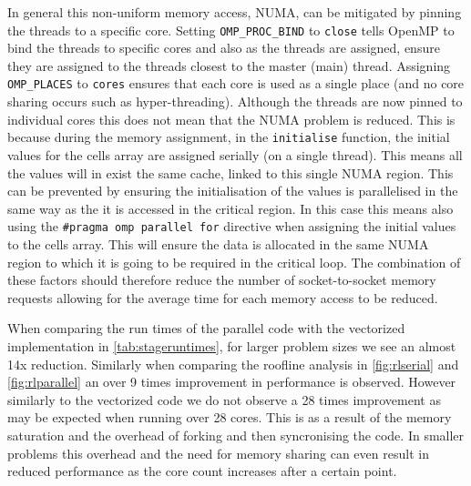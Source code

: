 \documentclass{article}
\begin{document}
\begin{multicols}{2}
In general this non-uniform memory access, NUMA, can be mitigated by pinning 
the threads to a specific core. Setting \verb|OMP_PROC_BIND| to \verb|close|
tells OpenMP to bind the threads to specific cores and also as the threads are
assigned, ensure they are assigned to the threads closest to the master (main)
thread. Assigning \verb|OMP_PLACES| to \verb|cores| ensures that each
core is used as a single place (and no core sharing occurs such as
hyper-threading). Although the threads are now pinned to individual cores this
does not mean that the NUMA problem is reduced. This is because during the
memory assignment, in the \verb|initialise| function, the initial values for the
cells array are assigned serially (on a single thread). This means all the
values will in exist the same cache, linked to this single NUMA region. This
can be prevented by ensuring the initialisation of the values is parallelised
in the same way as the it is accessed in the critical region. In this case this
means also using the \verb|#pragma omp parallel for| directive when assigning the initial
values to the cells array. This will ensure the data is allocated in the same
NUMA region to which it is going to be required in the critical loop. The
combination of these factors should therefore reduce the number of
socket-to-socket memory requests allowing for the average time for each memory
access to be reduced.  

When comparing the run times of the parallel code with the vectorized
implementation in \autoref{tab:stageruntimes}, for larger problem sizes we see
an almost 14x reduction. Similarly when comparing the roofline analysis in
\autoref{fig:rlserial} and \autoref{fig:rlparallel} an over 9 times improvement
in performance is observed. However similarly to the vectorized code we do not
observe a 28 times improvement as may be expected when running over 28 cores.
This is as a result of the memory saturation and the overhead of forking and
then syncronising the code. In smaller problems this overhead and the need for
memory sharing can even result in reduced performance as the core count increases
after a certain point.



\end{multicols}
\end{document}
